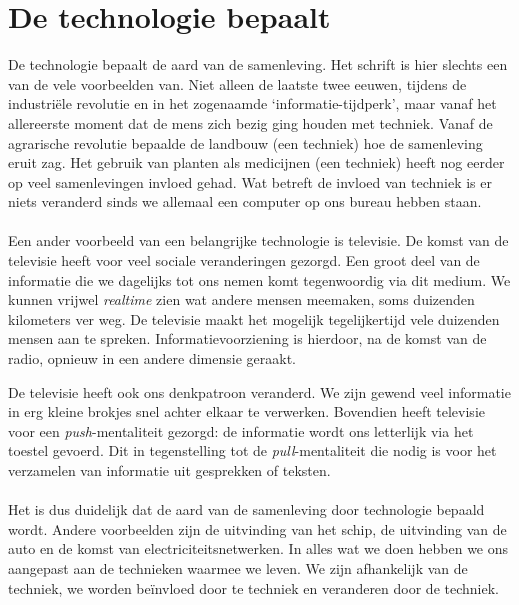 \documentclass[11pt]{report}
\begin{document}
\section{De technologie bepaalt}

De technologie bepaalt de aard van de samenleving. Het schrift is hier slechts een van de vele voorbeelden van. Niet alleen de laatste twee eeuwen, tijdens de industri\"ele revolutie en in het zogenaamde `informatie-tijdperk', maar vanaf het allereerste moment dat de mens zich bezig ging houden met techniek. Vanaf de agrarische revolutie bepaalde de landbouw (een techniek) hoe de samenleving eruit zag. Het gebruik van planten als medicijnen (een techniek) heeft nog eerder op veel samenlevingen invloed gehad. Wat betreft de invloed van techniek is er niets veranderd sinds we allemaal een computer op ons bureau hebben staan.

\paragraph{}

Een ander voorbeeld van een belangrijke technologie is televisie. De komst van de televisie heeft voor veel sociale veranderingen gezorgd. Een groot deel van de informatie die we dagelijks tot ons nemen komt tegenwoordig via dit medium. We kunnen vrijwel \emph{realtime} zien wat andere mensen meemaken, soms duizenden kilometers ver weg. De televisie maakt het mogelijk tegelijkertijd vele duizenden mensen aan te spreken. Informatievoorziening is hierdoor, na de komst van de radio, opnieuw in een andere dimensie geraakt.

De televisie heeft ook ons denkpatroon veranderd. We zijn gewend veel informatie in erg kleine brokjes snel achter elkaar te verwerken. Bovendien heeft televisie voor een \emph{push}-mentaliteit gezorgd: de informatie wordt ons letterlijk via het toestel gevoerd. Dit in tegenstelling tot de \emph{pull}-mentaliteit die nodig is voor het verzamelen van informatie uit gesprekken of teksten.

\paragraph{}

Het is dus duidelijk dat de aard van de samenleving door technologie bepaald wordt. Andere voorbeelden zijn de uitvinding van het schip, de uitvinding van de auto en de komst van electriciteitsnetwerken. In alles wat we doen hebben we ons aangepast aan de technieken waarmee we leven. We zijn afhankelijk van de techniek, we worden be\"invloed door te techniek en veranderen door de techniek.
\end{document}
